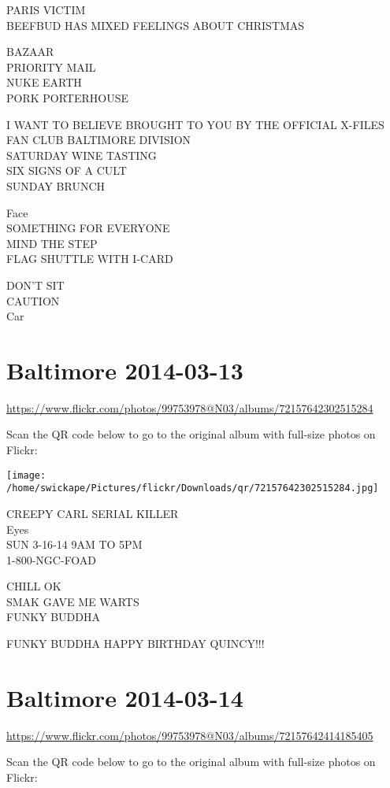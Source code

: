 \documentclass[10pt,letterpaper]{article}
\begin{document}
PARIS VICTIM\\
BEEFBUD HAS MIXED FEELINGS ABOUT CHRISTMAS

BAZAAR\\
PRIORITY MAIL\\
NUKE EARTH\\
PORK PORTERHOUSE

I WANT TO BELIEVE BROUGHT TO YOU BY THE OFFICIAL X{-}FILES FAN CLUB BALTIMORE DIVISION\\
SATURDAY WINE TASTING\\
SIX SIGNS OF A CULT\\
SUNDAY BRUNCH

Face\\
SOMETHING FOR EVERYONE\\
MIND THE STEP\\
FLAG SHUTTLE WITH I{-}CARD

DON'T SIT\\
CAUTION\\
Car
\pagebreak

\section*{Baltimore 2014-03-13}

\url{https://www.flickr.com/photos/99753978@N03/albums/72157642302515284}

Scan the QR code below to go to the original album with full-size photos on Flickr:

\texttt{[image: /home/swickape/Pictures/flickr/Downloads/qr/72157642302515284.jpg]}
\pagebreak

CREEPY CARL SERIAL KILLER\\
Eyes\\
SUN 3{-}16{-}14 9AM TO 5PM\\
1{-}800{-}NGC{-}FOAD

CHILL OK\\
SMAK GAVE ME WARTS\\
FUNKY BUDDHA

FUNKY BUDDHA HAPPY BIRTHDAY QUINCY!!!
\pagebreak

\section*{Baltimore 2014-03-14}

\url{https://www.flickr.com/photos/99753978@N03/albums/72157642414185405}

Scan the QR code below to go to the original album with full-size photos on Flickr:
\end{document}
